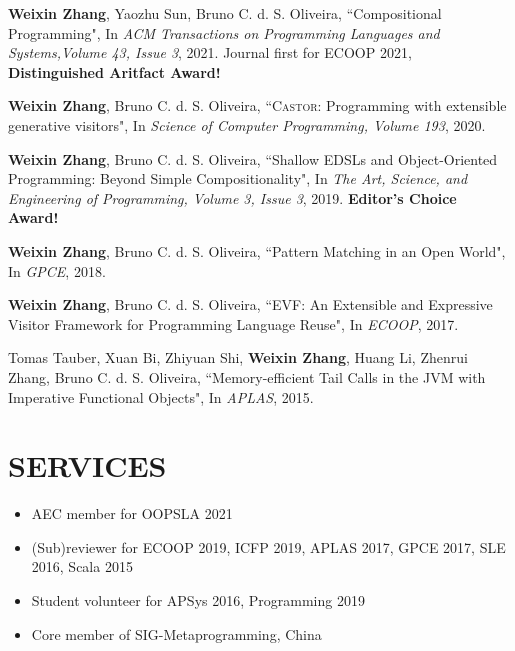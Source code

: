 \documentclass[paper=letter,fontsize=11pt]{scrartcl} %
\newcommand{\NewPart}[2]{\section*{\uppercase{#1} #2}}
\newcommand{\PaperEntry}[4]{
		\noindent #1, ``{#2}", In \textit{#3}, #4.} %
\newcommand{\ArxivEntry}[3]{
		\noindent #1, ``\href{http://arxiv.org/abs/#3}{#2}", \textit{{cond-mat/}#3}.}
\begin{document}
\begin{etaremune}

\item \PaperEntry{\textbf{Weixin Zhang}, Yaozhu Sun, Bruno C. d. S.
    Oliveira}{Compositional Programming}{ACM Transactions on Programming Languages and Systems,Volume 43, Issue 3}{2021}{ Journal first for ECOOP 2021, \textbf{Distinguished Aritfact Award!}}

\item \PaperEntry{\textbf{Weixin Zhang}, Bruno C. d. S.
    Oliveira}{\textsc{Castor}: Programming with extensible generative
    visitors}{Science of Computer Programming, Volume 193}{2020} 

\item \PaperEntry{\textbf{Weixin Zhang}, Bruno C. d. S. Oliveira}{Shallow EDSLs
    and Object-Oriented Programming: Beyond Simple Compositionality}{The Art,
    Science, and Engineering of Programming, Volume 3, Issue 3}{2019}{ \textbf{Editor's Choice Award!}}

\item \PaperEntry{\textbf{Weixin Zhang}, Bruno C. d. S. Oliveira}{Pattern
    Matching in an Open World}{GPCE}{2018}

\item \PaperEntry{\textbf{Weixin Zhang}, Bruno C. d. S. Oliveira}{EVF: An Extensible and
    Expressive Visitor Framework for Programming Language Reuse}{ECOOP}{2017}

\item \PaperEntry{Tomas Tauber, Xuan Bi, Zhiyuan Shi, \textbf{Weixin Zhang}, Huang Li, Zhenrui Zhang, Bruno C. d. S. Oliveira}{Memory-efficient Tail Calls in the JVM with Imperative Functional Objects}{APLAS}{2015}
\end{etaremune}




\NewPart{Services}{}
\begin{itemize}
\item AEC member for OOPSLA 2021
\item (Sub)reviewer for ECOOP 2019, ICFP 2019, APLAS 2017, GPCE 2017, SLE
  2016, Scala 2015
\item Student volunteer for APSys 2016, Programming 2019
\item Core member of SIG-Metaprogramming, China
\end{itemize}
\end{document}
